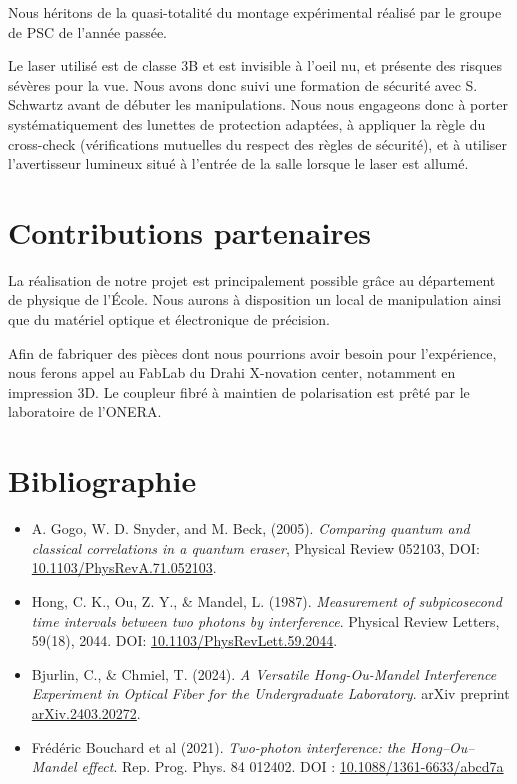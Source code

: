 \documentclass[a4paper, 12pt]{article}
\begin{document}
Nous héritons de la quasi-totalité du montage expérimental réalisé par le groupe de PSC de l’année passée.

Le laser utilisé est de classe 3B et est invisible à l’oeil nu, et présente des risques sévères pour la vue. Nous avons donc suivi une formation de sécurité avec S. Schwartz avant de débuter les manipulations. Nous nous engageons donc à porter systématiquement des lunettes de protection adaptées,  à appliquer la règle du cross-check (vérifications mutuelles du respect des règles de sécurité), et à utiliser l’avertisseur lumineux situé à l’entrée de la salle lorsque le laser est allumé.

\clearpage

\section{Contributions partenaires}

La réalisation de notre projet est principalement possible grâce au département de physique de l'École. Nous aurons à disposition un local de manipulation ainsi que du matériel optique et électronique de précision.

Afin de fabriquer des pièces dont nous pourrions avoir besoin pour l’expérience, nous ferons appel au FabLab du Drahi X-novation center, notamment en impression 3D.
Le coupleur fibré à maintien de polarisation est prêté par le laboratoire de l’ONERA.

\section{Bibliographie}

\begin{itemize}
    \item[\textbf{[1]}] A. Gogo, W. D. Snyder, and M. Beck, (2005). \textit{Comparing quantum and classical correlations in a quantum eraser}, Physical Review 052103, DOI: \href{https://doi.org/10.1103/PhysRevA.71.052103}{10.1103/PhysRevA.71.052103}.
    \item[\textbf{[2]}] Hong, C. K., Ou, Z. Y., \& Mandel, L. (1987). \textit{Measurement of subpicosecond time intervals between two photons by interference}. Physical Review Letters, 59(18), 2044. DOI: \href{https://doi.org/10.1103/PhysRevLett.59.2044}{10.1103/PhysRevLett.59.2044}.
    \item[\textbf{[3]}] Bjurlin, C., \& Chmiel, T. (2024). \textit{A Versatile Hong-Ou-Mandel Interference Experiment in Optical Fiber for the Undergraduate Laboratory}. arXiv preprint \href{https://doi.org/10.48550/arXiv.2403.20272}{arXiv.2403.20272}.
    \item[\textbf{[4]}] Frédéric Bouchard et al (2021). \textit{Two-photon interference: the Hong–Ou–Mandel effect}. Rep. Prog. Phys. 84 012402. DOI : \href{https://doi.org/10.1088/1361-6633/abcd7a}{10.1088/1361-6633/abcd7a}
\end{itemize}
\end{document}
